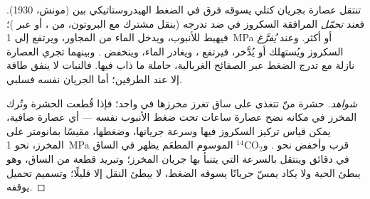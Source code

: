 \begin{theorem}\label{thm:b1:plant-transport:pressureflow}
تنتقل عصارة  بجريان كتلي يسوقه فرق في الضغط الهيدروستاتيكي
بين   (مونش، 1930). فعند  \emph{تحمّل} 
المرافقة السكروز في  ضد تدرجه (بنقل مشترك مع
البروتون، من ، أو عبر )؛ فيهبط  للأنبوب، ويدخل الماء من  المجاور، ويرتفع  إلى
\qty{1}{MPa} أو أكثر. وعند  \emph{يُفرَّغ} السكروز ويُستهلك أو
يُدَّخر، فيرتفع ، ويغادر الماء، وينخفض .
وبينهما تجري العصارة نازلة مع تدرج الضغط عبر الصفائح الغربالية،
حاملة ما ذاب فيها. فالنبات لا ينفق طاقة إلا عند الطرفين؛ أما
الجريان نفسه فسلبي.
\end{theorem}
\begin{proof}[شواهد]
حشرة منّ تتغذى على ساق تغرز مخرزها في  واحد؛ فإذا
قُطعت الحشرة وتُرك المخرز في مكانه نضح عصارة ساعات تحت ضغط الأنبوب
نفسه --- أي عصارة  صافية، يمكن قياس تركيز السكروز فيها وسرعة
جريانها، وضغطها، مقيسًا بمانومتر على المخرز، نحو \qty{1}{MPa} قرب
 وأخفض نحو . و$\mathrm{^{14}CO_2}$ الموسوم المطعَم
 يظهر في  الساق في دقائق وينتقل بالسرعة التي يتنبأ بها
جريان المخرز؛ وتبريد قطعة من الساق، وهو يبطئ  الحية ولا
يكاد يمسّ جريانًا يسوقه الضغط، لا يبطئ النقل إلا قليلًا؛ وتسميم
تحميل   يوقفه.
\end{proof}

